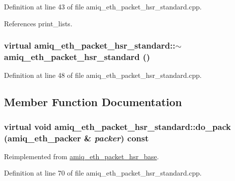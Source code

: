 Definition at line 43 of file amiq\_\-eth\_\-packet\_\-hsr\_\-standard.cpp.

References print\_\-lists.\hypertarget{classamiq__eth__packet__hsr__standard_a0a708cd8f8aef3f459ce8efe1e6ff935}{
\subsubsection[{$\sim$amiq\_\-eth\_\-packet\_\-hsr\_\-standard}]{\setlength{\rightskip}{0pt plus 5cm}virtual amiq\_\-eth\_\-packet\_\-hsr\_\-standard::$\sim$amiq\_\-eth\_\-packet\_\-hsr\_\-standard ()}}
\label{classamiq__eth__packet__hsr__standard_a0a708cd8f8aef3f459ce8efe1e6ff935}


Definition at line 48 of file amiq\_\-eth\_\-packet\_\-hsr\_\-standard.cpp.

\subsection{Member Function Documentation}
\hypertarget{classamiq__eth__packet__hsr__standard_a1dce9b763e3222c2fe257b15df912514}{
\subsubsection[{do\_\-pack}]{\setlength{\rightskip}{0pt plus 5cm}virtual void amiq\_\-eth\_\-packet\_\-hsr\_\-standard::do\_\-pack ({\bf amiq\_\-eth\_\-packer} \& {\em packer}) const}}
\label{classamiq__eth__packet__hsr__standard_a1dce9b763e3222c2fe257b15df912514}


Reimplemented from \hyperlink{classamiq__eth__packet__hsr__base_a6dc22f94409c889f248908b1454af8b0}{amiq\_\-eth\_\-packet\_\-hsr\_\-base}.

Definition at line 70 of file amiq\_\-eth\_\-packet\_\-hsr\_\-standard.cpp.

